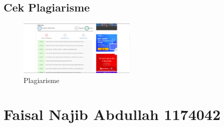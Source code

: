 	\subsection{Cek Plagiarisme}
	\begin{figure}[ht]
            \centerline{\includegraphics[width=0.5\textwidth]{figures/4/1174040/Teori/1174040_plagiat.png}}
            \caption{Plagiarisme}
            \label{1174040_plagiat}
            \end{figure}
			

\section{Faisal Najib Abdullah 1174042}
